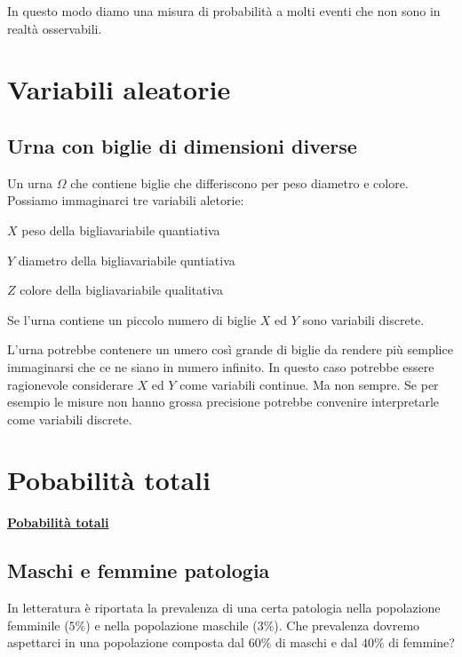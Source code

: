\documentclass[11pt,openany]{book}
\begin{document}
In questo modo diamo una misura di probabilità a molti eventi che non sono in realtà osservabili. 



\clearpage\section{Variabili aleatorie}

\subsection{Urna con biglie di dimensioni diverse}
\label{Urna_biglie_diverse}

Un urna $\Omega$ che contiene biglie che differiscono per peso diametro e colore. Possiamo immaginarci tre variabili aletorie:

$X$ peso della biglia\hfill variabile quantiativa

$Y$ diametro della biglia\hfill variabile quntiativa

$Z$ colore della biglia\hfill variabile qualitativa

Se l'urna contiene un piccolo numero di biglie $X$ ed $Y$ sono variabili discrete.

L'urna potrebbe contenere un umero così grande di biglie da rendere più semplice immaginarsi che ce ne siano in numero infinito. In questo caso potrebbe essere ragionevole considerare $X$ ed $Y$ come variabili continue. Ma non sempre. Se per esempio le misure non hanno grossa precisione potrebbe convenire interpretarle come variabili discrete.

\clearpage\section{Pobabilità totali}


\hfill\textbf{{\color{brown}\hyperref[TeoremaProbabilitaTotali]{Pobabilità totali} \faShare}}
\subsection{Maschi e femmine patologia}
\label{MF_totali}



In letteratura è riportata la prevalenza di una certa patologia nella popolazione femminile ($5\%$) e nella popolazione maschile ($3\%$). Che prevalenza dovremo aspettarci in una popolazione composta dal $60\%$ di maschi e dal $40\%$ di femmine?
\end{document}
